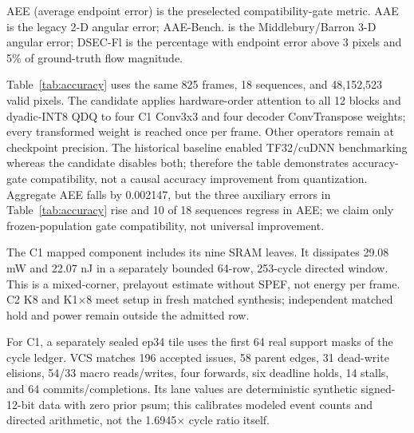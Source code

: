 \documentclass[conference]{IEEEtran}
\begin{document}
AEE (average endpoint error) is the preselected compatibility-gate metric.
AAE is the legacy 2-D angular error; AAE-Bench. is the Middlebury/Barron 3-D
angular error; DSEC-Fl is the percentage with endpoint error above 3 pixels and
5\% of ground-truth flow magnitude.

Table~\ref{tab:accuracy} uses the same 825 frames, 18 sequences, and
48,152,523 valid pixels.  The candidate applies hardware-order attention to all
12 blocks and dyadic-INT8 QDQ to four C1 Conv3x3 and four decoder
ConvTranspose weights; every transformed weight is reached once per frame.
Other operators remain at checkpoint precision.  The historical baseline
enabled TF32/cuDNN benchmarking whereas the candidate disables both; therefore
the table demonstrates accuracy-gate compatibility, not a causal accuracy
improvement from quantization.
Aggregate AEE falls by 0.002147, but the three auxiliary errors in
Table~\ref{tab:accuracy} rise and 10 of 18 sequences regress in AEE; we claim
only frozen-population gate compatibility, not universal improvement.

The C1 mapped component includes its nine SRAM leaves.  It dissipates 29.08 mW
and 22.07 nJ in a separately bounded 64-row, 253-cycle directed window.  This is
a mixed-corner, prelayout estimate without SPEF, not energy per frame.  C2 K8
and K1$\times$8 meet setup in fresh matched synthesis; independent matched hold
and power remain outside the admitted row.

For C1, a separately sealed ep34 tile uses the first 64 real support masks of
the cycle ledger.  VCS matches 196 accepted issues, 58 parent edges, 31
dead-write elisions, 54/33 macro reads/writes, four forwards, six deadline
holds, 14 stalls, and 64 commits/completions.  Its lane values are deterministic
synthetic signed-12-bit data with zero prior psum; this calibrates modeled event
counts and directed arithmetic, not the 1.6945$\times$ cycle ratio itself.
\end{document}
